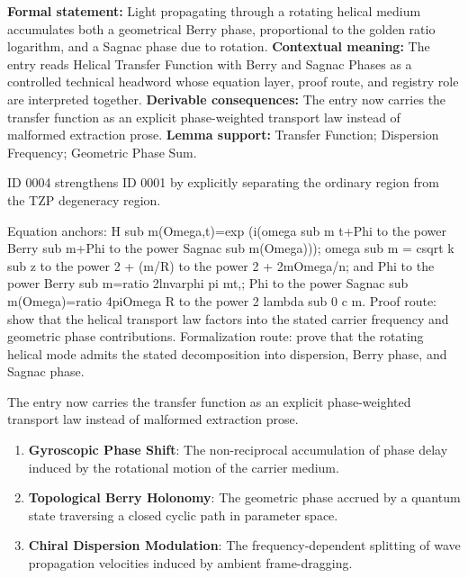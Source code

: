 \begingroup\footnotesize\setlength{\emergencystretch}{3em}\sloppy
\textbf{Formal statement:} Light propagating through a rotating helical medium accumulates both a geometrical Berry phase, proportional to the golden ratio logarithm, and a Sagnac phase due to rotation. \textbf{Contextual meaning:} The entry reads Helical Transfer Function with Berry and Sagnac Phases as a controlled technical headword whose equation layer, proof route, and registry role are interpreted together. \textbf{Derivable consequences:} The entry now carries the transfer function as an explicit phase-weighted transport law instead of malformed extraction prose. \textbf{Lemma support:} Transfer Function; Dispersion Frequency; Geometric Phase Sum.\par
\endgroup

ID 0004 strengthens ID 0001 by explicitly separating the ordinary region from the TZP degeneracy region.

Equation anchors: H sub m(Omega,t)=exp (i(omega sub m t+Phi to the power Berry sub m+Phi to the power Sagnac sub m(Omega))); omega sub m = csqrt k sub z to the power 2 + (m/R) to the power 2 + 2mOmega/n; and Phi to the power Berry sub m=ratio 2lnvarphi pi mt,; Phi to the power Sagnac sub m(Omega)=ratio 4piOmega R to the power 2 lambda sub 0 c m. Proof route: show that the helical transport law factors into the stated carrier frequency and geometric phase contributions. Formalization route: prove that the rotating helical mode admits the stated decomposition into dispersion, Berry phase, and Sagnac phase.

The entry now carries the transfer function as an explicit phase-weighted transport law instead of malformed extraction prose.
\endgroup

\begin{enumerate}[leftmargin=1.6em,itemsep=6pt,topsep=4pt]
\item \textbf{Gyroscopic Phase Shift}: The non-reciprocal accumulation of phase delay induced by the rotational motion of the carrier medium.
\item \textbf{Topological Berry Holonomy}: The geometric phase accrued by a quantum state traversing a closed cyclic path in parameter space.
\item \textbf{Chiral Dispersion Modulation}: The frequency-dependent splitting of wave propagation velocities induced by ambient frame-dragging.
\end{enumerate}

